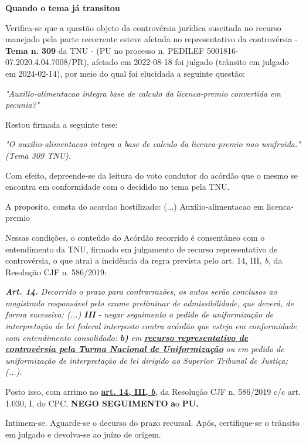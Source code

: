 \documentclass[12pt]{article}
\begin{document}
\justifying
\noindent \textbf{Quando o tema já transitou }

\noindent Verifica-se que a questão objeto da controvérsia jurídica suscitada no recurso manejado pela parte recorrente esteve afetada no representativo da controvérsia - \textbf{Tema n. }\textbf{309} da TNU - (PU no processo n. PEDILEF 5001816-07.2020.4.04.7008/PR),  afetado em 2022-08-18 foi julgado (trânsito em julgado em 2024-02-14), por meio do qual foi elucidada a seguinte questão:

\noindent \textit{"Auxilio-alimentacao integra base de calculo da licenca-premio convertida em pecunia?"}

\noindent Restou firmada a seguinte tese:

\noindent \textit{"O auxilio-alimentacao integra a base de calculo da licenca-premio nao usufruida." (Tema 309 TNU).}

\noindent Com efeito, depreende-se da leitura do voto condutor do acórdão que o mesmo se encontra em conformidade com o decidido no  tema pela TNU.

\noindent A proposito, consta do acordao hostilizado: (...) Auxilio-alimentacao em licenca-premio

\noindent Nessas condições, o conteúdo do Acórdão recorrido é consentâneo com o entendimento da TNU, firmado em julgamento de recurso representativo de controvérsia, o que atrai a incidência da regra prevista pelo art. 14, III, \textit{b,} da Resolução CJF n. 586/2019:

\noindent \textit{\textbf{Art. 14.}}\textit{ Decorrido o prazo para contrarrazões, os autos serão conclusos ao magistrado responsável pelo exame preliminar de admissibilidade, que deverá, de forma sucessiva: (...) }\textit{\textbf{III }}\textit{- negar seguimento a pedido de uniformização de interpretação de lei federal interposto contra acórdão que esteja em conformidade com entendimento consolidado: }\textit{\textbf{b)}}\textit{ em }\uline{\textit{\textbf{recurso representativo de controvérsia pela Turma Nacional de Uniformização}}}\textit{ ou em pedido de uniformização de interpretação de lei dirigido ao Superior Tribunal de Justiça;(...).}

\noindent Posto isso, com arrimo no \uline{\textbf{art. 14, III, }}\uline{\textit{\textbf{b}}}\textit{,} da Resolução CJF n. 586/2019 c/c art. 1.030, I, do CPC, \textbf{NEGO SEGUIMENTO }\textbf{a}o\textbf{ PU}\textbf{.}

\noindent Intimem-se. Aguarde-se o decurso do prazo recursal. Após, certifique-se o trânsito em julgado e devolva-se ao juízo de origem.
\end{document}
